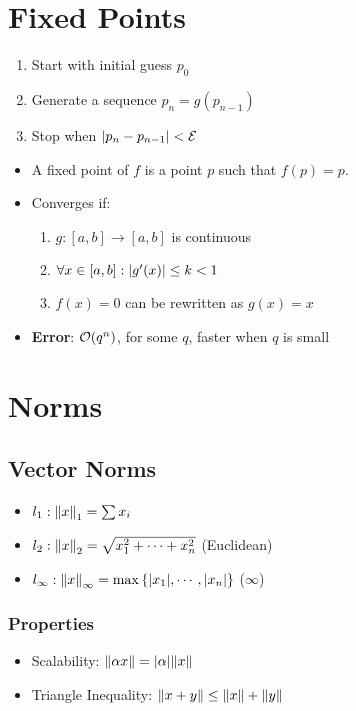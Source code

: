\documentclass[8pt, letterpaper]{extarticle}
\newcommand{\bigEps}{\mathcal{E}}
\begin{document}
\begin{multicols*}{3}
  \section{Fixed Points}
  \begin{enumerate}
    \item Start with initial guess $p_0$
    \item Generate a sequence $p_n = g(p_{n-1})$
    \item Stop when $\abs{p_n - p_{n-1}} < \bigEps$
  \end{enumerate}
  \begin{itemize}
    \item A fixed point of $f$ is a point $p$ such that $f(p) = p$.
    \item Converges if:
      \begin{enumerate}
        \item $g:[a,b] \to [a,b]$ is continuous
        \item $\forall x \in [a,b]: \abs{g'(x)} \leq k < 1 $
        \item $f(x) = 0$ can be rewritten as $g(x) = x$
      \end{enumerate}
    \item \textbf{Error}: $\order{q^n}$, for some $q$, faster when $q$ is small
  \end{itemize}

  \section{Norms}

  \subsection{Vector Norms}
  \begin{itemize}
    \item $l_1 : \norm{x}_1 = \sum x_i$
    \item $l_2 : \norm{x}_2 = \sqrt{x_1^2 + \dotsb + x_n^2}$ (Euclidean)
    \item $l_\infty : \norm{x}_\infty = \max{\{|x_1|, \dotsb, |x_n|\}}$
      ($\infty$) 
  \end{itemize}

  \subsubsection{Properties}
  \begin{itemize}
    \item Scalability: $\norm{\alpha x} = \abs{\alpha} \norm{x}$
    \item Triangle Inequality: $\norm{x+y} \leq \norm{x} + \norm{y}$
  \end{itemize}


\end{multicols*}
\end{document}
